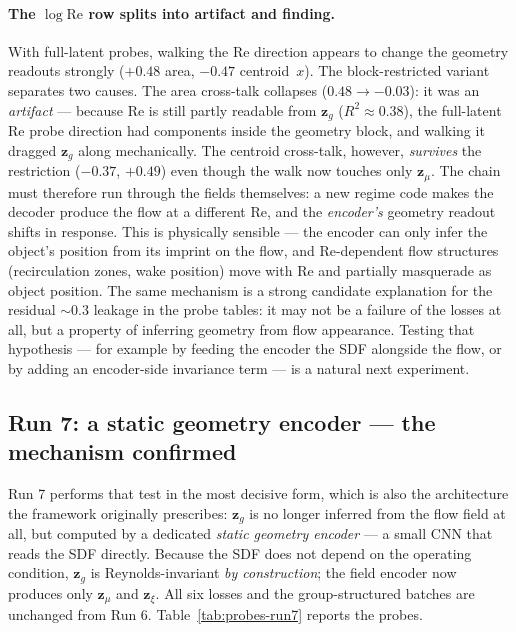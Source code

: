 \documentclass[11pt]{article}
\begin{document}
\paragraph{The $\log \mathrm{Re}$ row splits into artifact and finding.}
With full-latent probes, walking the Re direction appears to change the
geometry readouts strongly ($+0.48$ area, $-0.47$ centroid~$x$). The
block-restricted variant separates two causes. The area cross-talk
collapses ($0.48 \to -0.03$): it was an \emph{artifact} --- because Re
is still partly readable from $\boldsymbol{z}_{g}$ ($R^2 \approx 0.38$),
the full-latent Re probe direction had components inside the geometry
block, and walking it dragged $\boldsymbol{z}_{g}$ along mechanically.
The centroid cross-talk, however, \emph{survives} the restriction
($-0.37$, $+0.49$) even though the walk now touches only
$\boldsymbol{z}_{\mu}$. The chain must therefore run through the fields
themselves: a new regime code makes the decoder produce the flow at a
different Re, and the \emph{encoder's} geometry readout shifts in
response. This is physically sensible --- the encoder can only infer the
object's position from its imprint on the flow, and Re-dependent flow
structures (recirculation zones, wake position) move with Re and
partially masquerade as object position. The same mechanism is a strong
candidate explanation for the residual $\sim 0.3$ leakage in the probe
tables: it may not be a failure of the losses at all, but a property of
inferring geometry from flow appearance. Testing that hypothesis --- for
example by feeding the encoder the SDF alongside the flow, or by adding
an encoder-side invariance term --- is a natural next experiment.

\subsection{Run 7: a static geometry encoder --- the mechanism confirmed}

Run 7 performs that test in the most decisive form, which is also the
architecture the framework originally prescribes: $\boldsymbol{z}_{g}$
is no longer inferred from the flow field at all, but computed by a
dedicated \emph{static geometry encoder} --- a small CNN that reads the
SDF directly. Because the SDF does not depend on the operating
condition, $\boldsymbol{z}_{g}$ is Reynolds-invariant \emph{by
construction}; the field encoder now produces only
$\boldsymbol{z}_{\mu}$ and $\boldsymbol{z}_{\xi}$. All six losses and
the group-structured batches are unchanged from Run 6.
Table~\ref{tab:probes-run7} reports the probes.
\end{document}
